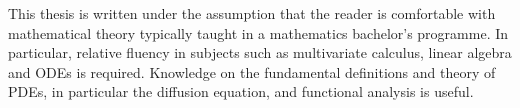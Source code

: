 This thesis is written under the assumption that the reader is comfortable with mathematical theory typically taught in a mathematics bachelor's programme. In particular, relative fluency in subjects such as multivariate calculus, linear algebra and ODEs is required. Knowledge on the fundamental definitions and theory of PDEs, in particular the diffusion equation, and functional analysis is useful.